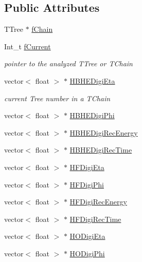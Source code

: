 \subsection*{Public Attributes}
\begin{DoxyCompactItemize}
\item 
T\+Tree $\ast$ \hyperlink{class_hcal_tuple_tree_ab2d0b951f1d870277db06338998d359c}{f\+Chain}
\item 
Int\+\_\+t \hyperlink{class_hcal_tuple_tree_a08b8ee5bd18d61d595dabae8738f94f0}{f\+Current}
\begin{DoxyCompactList}\small\item\em pointer to the analyzed T\+Tree or T\+Chain \end{DoxyCompactList}\item 
vector$<$ float $>$ $\ast$ \hyperlink{class_hcal_tuple_tree_abf3ece84d6c5e826fe0afe18259efdf6}{H\+B\+H\+E\+Digi\+Eta}
\begin{DoxyCompactList}\small\item\em current Tree number in a T\+Chain \end{DoxyCompactList}\item 
vector$<$ float $>$ $\ast$ \hyperlink{class_hcal_tuple_tree_a4465ac5c76bde5c83e2c0440e94377e6}{H\+B\+H\+E\+Digi\+Phi}
\item 
vector$<$ float $>$ $\ast$ \hyperlink{class_hcal_tuple_tree_a71d33dc8870ce67415396153c1c0b8fc}{H\+B\+H\+E\+Digi\+Rec\+Energy}
\item 
vector$<$ float $>$ $\ast$ \hyperlink{class_hcal_tuple_tree_a932a5241aeb73633d88a523951bd04b7}{H\+B\+H\+E\+Digi\+Rec\+Time}
\item 
vector$<$ float $>$ $\ast$ \hyperlink{class_hcal_tuple_tree_a4ee87b23a35d035afec70d98d6c319aa}{H\+F\+Digi\+Eta}
\item 
vector$<$ float $>$ $\ast$ \hyperlink{class_hcal_tuple_tree_a778805ed9ac0fb9bd7c0ada3adfb05ef}{H\+F\+Digi\+Phi}
\item 
vector$<$ float $>$ $\ast$ \hyperlink{class_hcal_tuple_tree_a3e26e7151e6cbba42bee136f6e46e07e}{H\+F\+Digi\+Rec\+Energy}
\item 
vector$<$ float $>$ $\ast$ \hyperlink{class_hcal_tuple_tree_af95d1984176d950add73dc9d411cda04}{H\+F\+Digi\+Rec\+Time}
\item 
vector$<$ float $>$ $\ast$ \hyperlink{class_hcal_tuple_tree_af4c462a15fc5e42100dc88e4eaa16f1e}{H\+O\+Digi\+Eta}
\item 
vector$<$ float $>$ $\ast$ \hyperlink{class_hcal_tuple_tree_a31ee04dc7198ca962dfaf857a6e19339}{H\+O\+Digi\+Phi}

\end{DoxyCompactItemize}
